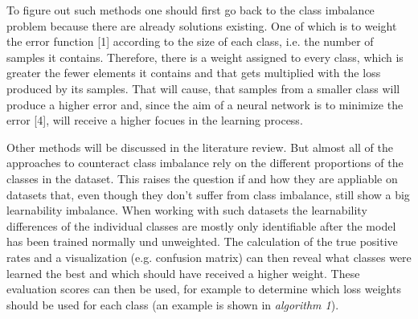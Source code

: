 \documentclass[journal]{IEEEtran}
\begin{document}


To figure out such methods one should first go back to the class imbalance problem because there are already solutions existing.
One of which is to weight the error function [1] according to the size of each class, i.e. the number of samples it contains.
Therefore, there is a weight assigned to every class, which is greater the fewer elements it contains and that gets multiplied with the loss produced by its samples. %
That will cause, that samples from a smaller class will produce a higher error and, since the aim of a neural network is to minimize the error [4], will receive a higher focues in the learning process.

Other methods will be discussed in the literature review. 
But almost all of the approaches to counteract class imbalance rely on the different proportions of the classes in the dataset. 
This raises the question if and how they are appliable on datasets that, even though they don't suffer from class imbalance, still show a big learnability imbalance.
When working with such datasets the learnability differences of the individual classes are mostly only identifiable after the model has been trained normally und unweighted. %
The calculation of the true positive rates and a visualization (e.g. confusion matrix) can then reveal what classes were learned the best and which should have received a higher weight.
These evaluation scores can then be used, for example to determine which loss weights should be used for each class (an example is shown in \emph{algorithm 1}).
\end{document}
